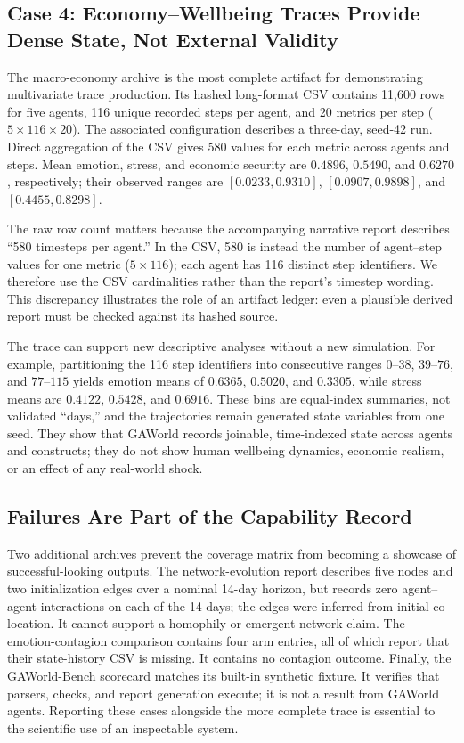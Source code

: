 \subsection{Case 4: Economy--Wellbeing Traces Provide Dense State, Not External Validity}

The macro-economy archive is the most complete artifact for demonstrating
multivariate trace production.  Its hashed long-format CSV contains 11,600
rows for five agents, 116 unique recorded steps per agent, and 20 metrics per
step ($5\times116\times20$).  The associated configuration describes a
three-day, seed-42 run.  Direct aggregation of the CSV gives 580 values for
each metric across agents and steps.  Mean emotion, stress, and economic
security are $0.4896$, $0.5490$, and $0.6270$, respectively; their observed
ranges are $[0.0233,0.9310]$, $[0.0907,0.9898]$, and
$[0.4455,0.8298]$.

The raw row count matters because the accompanying narrative report describes
``580 timesteps per agent.''  In the CSV, 580 is instead the number of
agent--step values for one metric ($5\times116$); each agent has 116 distinct
step identifiers.  We therefore use the CSV cardinalities rather than the
report's timestep wording.  This discrepancy illustrates the role of an
artifact ledger: even a plausible derived report must be checked against its
hashed source.

The trace can support new descriptive analyses without a new simulation.  For
example, partitioning the 116 step identifiers into consecutive ranges
$0$--$38$, $39$--$76$, and $77$--$115$ yields emotion means of $0.6365$,
$0.5020$, and $0.3305$, while stress means are $0.4122$, $0.5428$, and
$0.6916$.  These bins are equal-index summaries, not validated ``days,'' and
the trajectories remain generated state variables from one seed.  They show
that GAWorld records joinable, time-indexed state across agents and constructs;
they do not show human wellbeing dynamics, economic realism, or an effect of
any real-world shock.

\subsection{Failures Are Part of the Capability Record}

Two additional archives prevent the coverage matrix from becoming a showcase
of successful-looking outputs.  The network-evolution report describes five
nodes and two initialization edges over a nominal 14-day horizon, but records
zero agent--agent interactions on each of the 14 days; the edges were inferred
from initial co-location.  It cannot support a homophily or emergent-network
claim.  The emotion-contagion comparison contains four arm entries, all of
which report that their state-history CSV is missing.  It contains no contagion
outcome.  Finally, the GAWorld-Bench scorecard matches its built-in synthetic
fixture.  It verifies that parsers, checks, and report generation execute; it
is not a result from GAWorld agents.  Reporting these cases alongside the more
complete trace is essential to the scientific use of an inspectable system.
